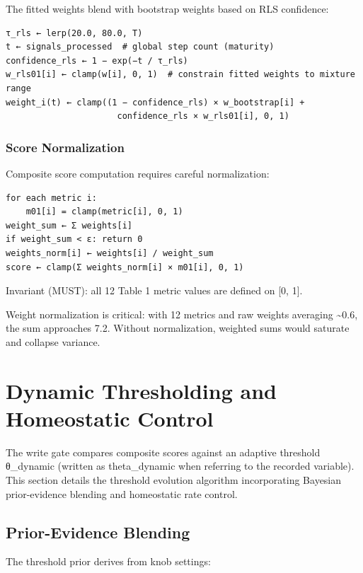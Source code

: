 \documentclass[
  letterpaper,
  DIV=11,
  numbers=noendperiod]{scrartcl}
\begin{document}
The fitted weights blend with bootstrap weights based on RLS confidence:

\begin{verbatim}
τ_rls ← lerp(20.0, 80.0, T)
t ← signals_processed  # global step count (maturity)
confidence_rls ← 1 − exp(−t / τ_rls)
w_rls01[i] ← clamp(w[i], 0, 1)  # constrain fitted weights to mixture range
weight_i(t) ← clamp((1 − confidence_rls) × w_bootstrap[i] +
                      confidence_rls × w_rls01[i], 0, 1)
\end{verbatim}

\subsubsection{Score Normalization}\label{score-normalization}

Composite score computation requires careful normalization:

\begin{verbatim}
for each metric i:
    m01[i] = clamp(metric[i], 0, 1)
weight_sum ← Σ weights[i]
if weight_sum < ε: return 0
weights_norm[i] ← weights[i] / weight_sum
score ← clamp(Σ weights_norm[i] × m01[i], 0, 1)
\end{verbatim}

Invariant (MUST): all 12 Table 1 metric values are defined on {[}0,
1{]}.

Weight normalization is critical: with 12 metrics and raw weights
averaging \textasciitilde0.6, the sum approaches 7.2. Without
normalization, weighted sums would saturate and collapse variance.

\section{Dynamic Thresholding and Homeostatic
Control}\label{sec-thresholding}

The write gate compares composite scores against an adaptive threshold
θ\_dynamic (written as theta\_dynamic when referring to the recorded
variable). This section details the threshold evolution algorithm
incorporating Bayesian prior-evidence blending and homeostatic rate
control.

\subsection{Prior-Evidence Blending}\label{prior-evidence-blending}

The threshold prior derives from knob settings:
\end{document}
